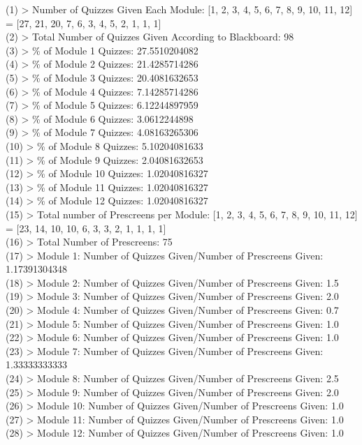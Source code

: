\documentclass[12pt]{article}
\begin{document}
\begin{mdframed}[style=CommandFrame]
(1) > Number of Quizzes Given Each Module: [1, 2, 3, 4, 5, 6, 7, 8, 9, 10, 11, 12] =  [27, 21, 20, 7, 6, 3, 4, 5, 2, 1, 1, 1] \\
(2) > Total Number of Quizzes Given According to Blackboard:  98 \\
(3) > \% of Module 1 Quizzes:  27.5510204082 \\
(4) > \% of Module 2 Quizzes:  21.4285714286 \\
(5) > \% of Module 3 Quizzes:  20.4081632653 \\
(6) > \% of Module 4 Quizzes:  7.14285714286 \\
(7) > \% of Module 5 Quizzes:  6.12244897959 \\
(8) > \% of Module 6 Quizzes:  3.0612244898 \\
(9) > \% of Module 7 Quizzes:  4.08163265306 \\
(10) > \% of Module 8 Quizzes:  5.10204081633 \\
(11) > \% of Module 9 Quizzes:  2.04081632653 \\
(12) > \% of Module 10 Quizzes:  1.02040816327 \\
(13) > \% of Module 11 Quizzes:  1.02040816327 \\
(14) > \% of Module 12 Quizzes:  1.02040816327 \\
(15) > Total number of Prescreens per Module:  [1, 2, 3, 4, 5, 6, 7, 8, 9, 10, 11, 12] =  [23, 14, 10, 10, 6, 3, 3, 2, 1, 1, 1, 1] \\
(16) > Total Number of Prescreens:  75 \\
(17) > Module 1: Number of Quizzes Given/Number of Prescreens Given:  1.17391304348 \\
(18) > Module 2: Number of Quizzes Given/Number of Prescreens Given:  1.5 \\
(19) > Module 3: Number of Quizzes Given/Number of Prescreens Given:  2.0 \\
(20) > Module 4: Number of Quizzes Given/Number of Prescreens Given:  0.7 \\
(21) > Module 5: Number of Quizzes Given/Number of Prescreens Given:  1.0 \\
(22) > Module 6: Number of Quizzes Given/Number of Prescreens Given:  1.0 \\
(23) > Module 7: Number of Quizzes Given/Number of Prescreens Given:  1.33333333333 \\
(24) > Module 8: Number of Quizzes Given/Number of Prescreens Given:  2.5 \\
(25) > Module 9: Number of Quizzes Given/Number of Prescreens Given:  2.0 \\
(26) > Module 10: Number of Quizzes Given/Number of Prescreens Given:  1.0 \\
(27) > Module 11: Number of Quizzes Given/Number of Prescreens Given:  1.0 \\
(28) > Module 12: Number of Quizzes Given/Number of Prescreens Given:  1.0 \\
\end{mdframed}
\end{document}
